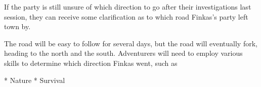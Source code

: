 If the party is still unsure of which direction to go after their investigations last session, they can receive some clarification as to which road Finkas's party left town by.

The road will be easy to follow for several days, but the road will eventually fork, heading to the north and the south.
Adventurers will need to employ various skills to determine which direction Finkas went, such as

* Nature
* Survival


